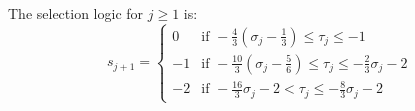 \documentclass{article}
\begin{document}
The selection logic for $j \geq 1$ is:
\begin{equation}
  \label{eq:sqrt:radix4_logic_special}
  s_{j+1} =
  \begin{cases}
    0  & \text{if } -\frac{4}{3} \left(\sigma_j - \frac{1}{3}\right) \leq \tau_j \leq -1 \\
    -1 & \text{if } -\frac{10}{3} \left(\sigma_j - \frac{5}{6}\right) \leq \tau_j \leq -\frac{2}{3} \sigma_j - 2 \\
    -2 & \text{if } -\frac{16}{3} \sigma_j - 2 < \tau_j \leq -\frac{8}{3} \sigma_j - 2
  \end{cases}
\end{equation}

\begin{figure}[htbp]
  \centering
  \begin{subfigure}[b]{0.32\textwidth}
    \centering

\end{subfigure}
\end{figure}
\end{document}
